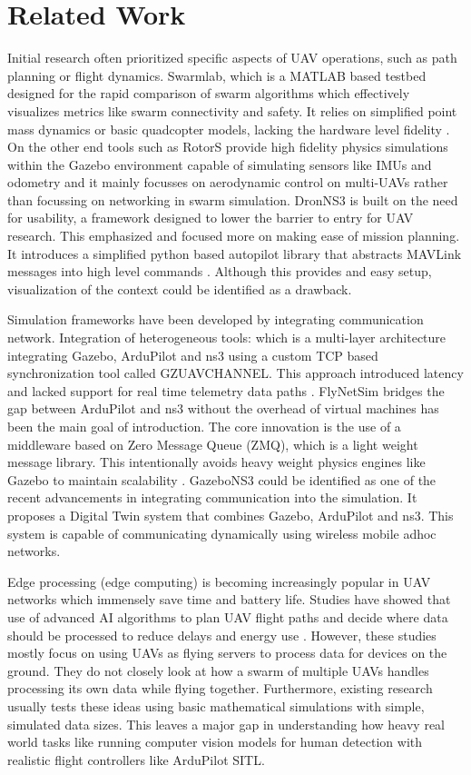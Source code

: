 \section{Related Work}

Initial research often prioritized specific aspects of UAV operations, such as path planning or flight dynamics. Swarmlab, which is a MATLAB based testbed designed for the rapid comparison of swarm algorithms which effectively visualizes metrics like swarm connectivity and safety. It relies on simplified point mass dynamics or basic quadcopter models, lacking the hardware level fidelity \cite{swarmlab}. On the other end tools such as RotorS provide high fidelity physics simulations within the Gazebo environment \cite{rotorS} capable of simulating sensors like IMUs and odometry and it mainly focusses on aerodynamic control on multi-UAVs rather than focussing on networking in swarm simulation. DronNS3 is built on the need for usability, a framework designed to lower the barrier to entry for UAV research. This emphasized and focused more on making ease of mission planning. It introduces a simplified python based autopilot library that abstracts MAVLink messages into high level commands \cite{drons3}. Although this provides and easy setup, visualization of the context could be identified as a drawback.

Simulation frameworks have been developed by integrating communication network. Integration of heterogeneous tools: which is a multi-layer architecture integrating Gazebo, ArduPilot and ns3 using a custom TCP based synchronization tool called GZUAVCHANNEL. This approach introduced latency and lacked support for real time telemetry data paths \cite{avens}. FlyNetSim bridges the gap between ArduPilot and ns3 without the overhead of virtual machines has been the main goal of introduction. The core innovation is the use of a middleware based on Zero Message Queue (ZMQ), which is a light weight message library. This intentionally avoids heavy weight physics engines like Gazebo to maintain scalability \cite{flynetsim}. GazeboNS3 could be identified as one of the recent advancements in integrating communication into the simulation. It proposes a Digital Twin system that combines Gazebo, ArduPilot and ns3. This system is capable of communicating dynamically using wireless mobile adhoc networks.

Edge processing (edge computing) is becoming increasingly popular in 
UAV networks which immensely save time and battery life. Studies have showed that use of advanced AI algorithms to plan UAV flight paths and decide where data should be processed to reduce delays and energy use \cite{edgeWorks}. However, these studies mostly focus on using UAVs as flying servers to process data for devices on the ground. They do not closely look at how a swarm of multiple UAVs handles processing its own data while flying together. Furthermore, existing research usually tests these ideas using basic mathematical simulations with simple, simulated data sizes. This leaves a major gap in understanding how heavy real world tasks like running computer vision models for human detection with realistic flight controllers like ArduPilot SITL.